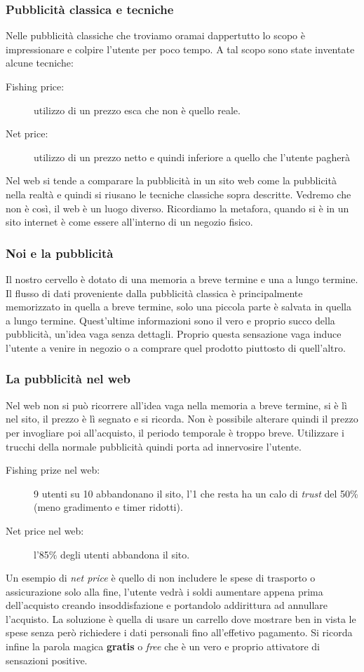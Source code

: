 		\subsubsection{Pubblicità classica e tecniche}
			Nelle pubblicità classiche che troviamo oramai dappertutto lo scopo è impressionare e colpire l'utente per poco tempo. A tal scopo sono state inventate alcune tecniche:
			\begin{description}
				\item[Fishing price:] utilizzo di un prezzo esca che non è quello reale.
				\item[Net price:] utilizzo di un prezzo netto e quindi inferiore a quello che l'utente pagherà
			\end{description}
			Nel web si tende a comparare la pubblicità in un sito web come la pubblicità nella realtà e quindi si riusano le tecniche classiche sopra descritte. Vedremo che non è così, il web è un luogo diverso. Ricordiamo la metafora, quando si è in un sito internet è come essere all'interno di un negozio fisico.
		
		\subsubsection{Noi e la pubblicità}
			Il nostro cervello è dotato di una memoria a breve termine e una a lungo termine. Il flusso di dati proveniente dalla pubblicità classica è principalmente memorizzato in quella a breve termine, solo una piccola parte è salvata in quella a lungo termine. Quest'ultime informazioni sono il vero e proprio succo della pubblicità, un'idea vaga senza dettagli. Proprio questa sensazione vaga induce l'utente a venire in negozio o a comprare quel prodotto piuttosto di quell'altro.
		
		\subsubsection{La pubblicità nel web}
			Nel web non si può ricorrere all'idea vaga nella memoria a breve termine, si è lì nel sito, il prezzo è lì segnato e si ricorda. Non è possibile alterare quindi il prezzo per invogliare poi all'acquisto, il periodo temporale è troppo breve. Utilizzare i trucchi della normale pubblicità 		 quindi porta ad innervosire l'utente.
			\begin{description}
				\item[Fishing prize nel web:] 9 utenti su 10 abbandonano il sito, l'1 che resta ha un calo di \emph{trust} del 50\% (meno gradimento e timer ridotti).
				\item[Net price nel web:] l'85\% degli utenti abbandona il sito. 
			\end{description}
			Un esempio di \emph{net price} è quello di non includere le spese di trasporto o assicurazione solo alla fine, l'utente vedrà i soldi aumentare appena prima dell'acquisto creando insoddisfazione e portandolo addirittura ad annullare l'acquisto. La soluzione è quella di usare un carrello dove mostrare ben in vista le spese senza però richiedere i dati personali fino all'effetivo pagamento.
			Si ricorda infine la parola magica \textbf{gratis} o \emph{free} che è un vero e proprio attivatore di sensazioni positive.
			
